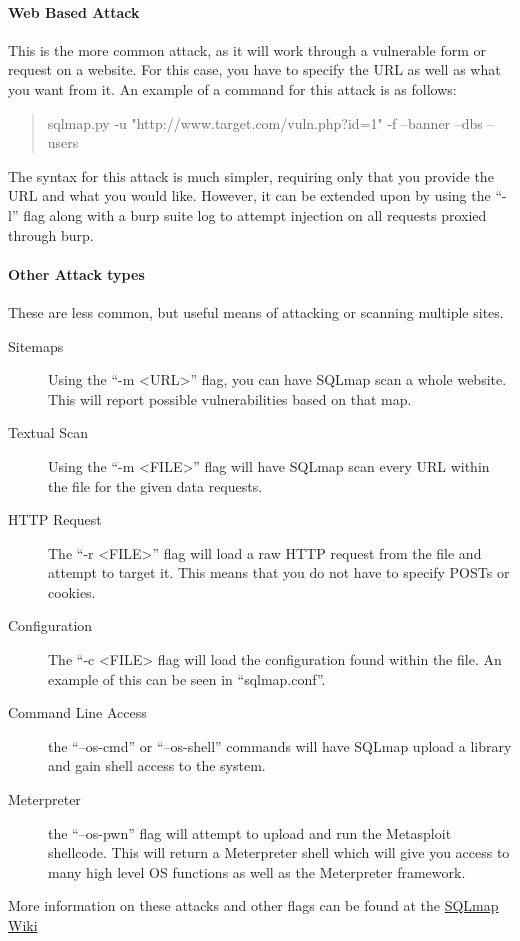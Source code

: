 \documentclass[a4paper,11pt]{report}
\begin{document}
			\paragraph{Web Based Attack}
				This is the more common attack, as it will work through a vulnerable form or request on a website. 
				For this case, you have to specify the URL as well as what you want from it. 
				An example of a command for this attack is as follows:
				\begin{quote}
					sqlmap.py -u "http://www.target.com/vuln.php?id=1" -f --banner --dbs --users
				\end{quote}

				The syntax for this attack is much simpler, requiring only that you provide the URL and what you would like. 
				However, it can be extended upon by using the ``-l'' flag along with a burp suite log to attempt injection on all requests proxied through burp. 

			\paragraph{Other Attack types}
				These are less common, but useful means of attacking or scanning multiple sites. 
				\begin{description}
					\item[Sitemaps] Using the ``-m <URL>'' flag, you can have SQLmap scan a whole website. 
						This will report possible vulnerabilities based on that map. 
					\item[Textual Scan] Using the ``-m <FILE>'' flag will have SQLmap scan every URL within the file for the given data requests. 
					\item[HTTP Request] The ``-r <FILE>'' flag will load a raw HTTP request from the file and attempt to target it. 
						This means that you do not have to specify POSTs or cookies. 
					\item[Configuration] The ``-c <FILE> flag will load the configuration found within the file. 
						An example of this can be seen in ``sqlmap.conf''. 
					\item[Command Line Access] the ``--os-cmd'' or ``--os-shell'' commands will have SQLmap upload a library and gain shell access to the system. 
					\item[Meterpreter] the ``--os-pwn'' flag will attempt to upload and run the Metasploit shellcode. 
						This will return a Meterpreter shell which will give you access to many high level OS functions as well as the Meterpreter framework. 
				\end{description}
				More information on these attacks and other flags can be found at the \href{https://github.com/sqlmapproject/sqlmap/wiki}{SQLmap Wiki}
\end{document}
